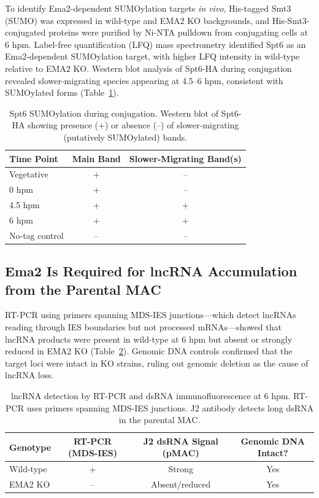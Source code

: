 \documentclass[11pt]{article}
\begin{document}
To identify Ema2-dependent SUMOylation targets \textit{in vivo}, His-tagged Smt3 (SUMO) was expressed in wild-type and EMA2 KO backgrounds, and His-Smt3-conjugated proteins were purified by Ni-NTA pulldown from conjugating cells at 6 hpm. Label-free quantification (LFQ) mass spectrometry identified Spt6 as an Ema2-dependent SUMOylation target, with higher LFQ intensity in wild-type relative to EMA2 KO. Western blot analysis of Spt6-HA during conjugation revealed slower-migrating species appearing at 4.5--6 hpm, consistent with SUMOylated forms (Table~\ref{tab:spt6_sumo}).

\begin{table}[H]
\centering
\caption{Spt6 SUMOylation during conjugation. Western blot of Spt6-HA showing presence (+) or absence (--) of slower-migrating (putatively SUMOylated) bands.}
\label{tab:spt6_sumo}
\begin{tabular}{lcc}
\toprule
\textbf{Time Point} & \textbf{Main Band} & \textbf{Slower-Migrating Band(s)} \\
\midrule
Vegetative & + & -- \\
0 hpm & + & -- \\
4.5 hpm & + & + \\
6 hpm & + & + \\
No-tag control & -- & -- \\
\bottomrule
\end{tabular}
\end{table}

\subsection{Ema2 Is Required for lncRNA Accumulation from the Parental MAC}

RT-PCR using primers spanning MDS-IES junctions---which detect lncRNAs reading through IES boundaries but not processed mRNAs---showed that lncRNA products were present in wild-type at 6 hpm but absent or strongly reduced in EMA2 KO (Table~\ref{tab:lncrna}). Genomic DNA controls confirmed that the target loci were intact in KO strains, ruling out genomic deletion as the cause of lncRNA loss.

\begin{table}[H]
\centering
\caption{lncRNA detection by RT-PCR and dsRNA immunofluorescence at 6 hpm. RT-PCR uses primers spanning MDS-IES junctions. J2 antibody detects long dsRNA in the parental MAC.}
\label{tab:lncrna}
\begin{tabular}{lccc}
\toprule
\textbf{Genotype} & \textbf{RT-PCR (MDS-IES)} & \textbf{J2 dsRNA Signal (pMAC)} & \textbf{Genomic DNA Intact?} \\
\midrule
Wild-type & + & Strong & Yes \\
EMA2 KO & -- & Absent/reduced & Yes \\
\bottomrule
\end{tabular}
\end{table}
\end{document}
